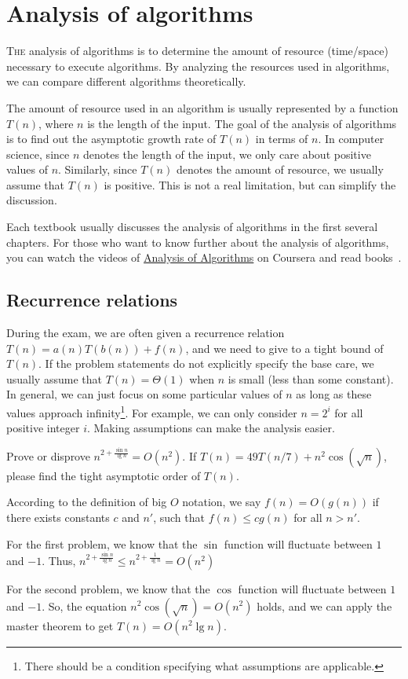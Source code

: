 \chapter{Analysis of algorithms}

\lettrine{T}{he} analysis of algorithms is to determine the amount of resource (time/space) necessary to execute algorithms.
By analyzing the resources used in algorithms, we can compare different algorithms theoretically.

The amount of resource used in an algorithm is usually represented by a function $T(n)$, where $n$ is the length of the input.
The goal of the analysis of algorithms is to find out the asymptotic growth rate of $T(n)$ in terms of $n$.
In computer science, since $n$ denotes the length of the input, we only care about positive values of $n$.
Similarly, since $T(n)$ denotes the amount of resource, we usually assume that $T(n)$ is positive.
This is not a real limitation, but can simplify the discussion.

Each textbook usually discusses the analysis of algorithms in the first several chapters.
For those who want to know further about the analysis of algorithms, you can watch the videos of \href{https://www.coursera.org/course/aofa}{Analysis of Algorithms} on Coursera and read books~\cite{Graham1994,Purdom2004,Sedgewick2013}.

\section{Recurrence relations}
During the exam, we are often given a recurrence relation $T(n) = a(n)T(b(n)) + f(n)$, and we need to give to a tight bound of $T(n)$. If the problem statements do not explicitly specify the base care, we usually assume that $T(n) = \Theta(1)$ when $n$ is small (less than some constant). In general, we can just focus on some particular values of $n$ as long as these values approach infinity\footnote{There should be a condition specifying what assumptions are applicable.}. For example, we can only consider $n = 2^i$ for all positive integer $i$. 
Making assumptions can make the analysis easier.

\begin{Exercise}[origin={YZU CSIE 90}]
\Question Prove or disprove $n^{2 + \frac{\sin n}{\lg n}} = O(n^2)$.
\Question If $T(n) = 49T(n/7) + n^2 \cos (\sqrt{n})$, please find the tight asymptotic order of $T(n)$.
\end{Exercise}
\begin{Answer}
According to the definition of big $O$ notation, we say $f(n) = O(g(n))$ if there exists constants $c$ and $n'$, such that $f(n) \leq cg(n)$ for all $n > n'$.

For the first problem, we know that the $\sin$ function will fluctuate between $1$ and $-1$. Thus, $n^{2 + \frac{\sin n}{\lg n}} \leq n^{2 + \frac{1}{\lg n}} = O(n^2)$

For the second problem, we know that the $\cos$ function will fluctuate between $1$ and $-1$. So, the equation $n^2 \cos (\sqrt{n}) = O(n^2)$ holds, and we can apply the master theorem to get $T(n) = O(n^2 \lg n)$.
\end{Answer}

